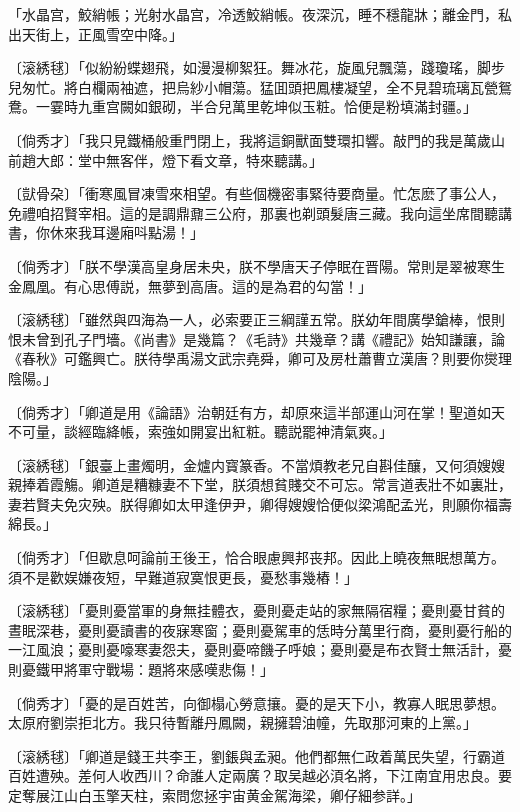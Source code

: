 \begin{myquote}
「水晶宫，鮫綃帳；光射水晶宫，冷透鮫綃帳。夜深沉，睡不穩龍牀；離金門，私出天街上，正風雪空中降。」　

{\markfont〔滚綉毬〕}「似紛紛蝶翅飛，如漫漫柳絮狂。舞冰花，旋風兒飄蕩，踐瓊瑤，脚步兒匆忙。將白欄兩袖遮，把烏紗小帽蕩。猛囬頭把鳳樓凝望，全不見碧琉璃瓦甇鴛鴦。一霎時九重宫闕如銀砌，半合兒萬里乾坤似玉粧。恰便是粉填滿封疆。」

{\markfont〔倘秀才〕}「我只見鐵桶般重門閉上，我將這銅獸面雙環扣響。敲門的我是萬歲山前趙大郎：堂中無客伴，燈下看文章，特來聽講。」

{\markfont〔獃骨朶〕}「衝寒風冒凍雪來相望。有些個機密事緊待要商量。忙怎麽了事公人，免禮咱招賢宰相。這的是調鼎鼐三公府，那裏也剃頭髮唐三藏。我向這坐席間聽講書，你休來我耳邊廂呌點湯！」

{\markfont〔倘秀才〕}「朕不學漢高皇身居未央，朕不學唐天子停眠在晋陽。常則是翠被寒生金鳳凰。有心思傅説，無夢到高唐。這的是為君的勾當！」

{\markfont〔滚綉毬〕}「雖然與四海為一人，必索要正三綱謹五常。朕幼年間廣學鎗棒，恨則恨未曾到孔子門墻。《尚書》是幾篇？《毛詩》共幾章？講《禮記》始知謙讓，論《春秋》可鑑興亡。朕待學禹湯文武宗堯舜，卿可及房杜蕭曹立漢唐？則要你爕理陰陽。」

{\markfont〔倘秀才〕}「卿道是用《論語》治朝廷有方，却原來這半部運山河在掌！聖道如天不可量，談經臨絳帳，索強如開宴出紅粧。聽説罷神清氣爽。」

{\markfont〔滚綉毬〕}「銀臺上畫燭明，金爐内寳篆香。不當煩教老兄自斟佳釀，又何須嫂嫂親捧着霞觴。卿道是糟糠妻不下堂，朕須想貧賤交不可忘。常言道表壯不如裏壯，妻若賢夫免灾殃。朕得卿如太甲逢伊尹，卿得嫂嫂恰便似梁鴻配孟光，則願你福壽綿長。」

{\markfont〔倘秀才〕}「但歇息呵論前王後王，恰合眼慮興邦丧邦。因此上曉夜無眠想萬方。須不是歡娱嫌夜短，早難道寂寞恨更長，憂愁事幾樁！」

{\markfont〔滚綉毬〕}「憂則憂當軍的身無挂體衣，憂則憂走站的家無隔宿糧；憂則憂甘貧的晝眠深巷，憂則憂讀書的夜寐寒窗；憂則憂駕車的恁時分萬里行商，憂則憂行船的一江風浪；憂則憂嚎寒妻怨夫，憂則憂啼饑子呼娘；憂則憂是布衣賢士無活計，憂則憂鐵甲將軍守戰場：題將來感嘆悲傷！」

{\markfont〔倘秀才〕}「憂的是百姓苦，向御榻心勞意攘。憂的是天下小，教寡人眠思夢想。太原府劉崇拒北方。我只待暫離丹鳳闕，親擁碧油幢，先取那河東的上黨。」

{\markfont〔滚綉毬〕}「卿道是錢王共李王，劉鋹與孟昶。他們都無仁政着萬民失望，行霸道百姓遭殃。差何人收西川？命誰人定兩廣？取吴越必湏名將，下江南宜用忠良。要定奪展江山白玉擎天柱，索問您拯宇宙黄金駕海梁，卿仔細参詳。」


\end{myquote}
